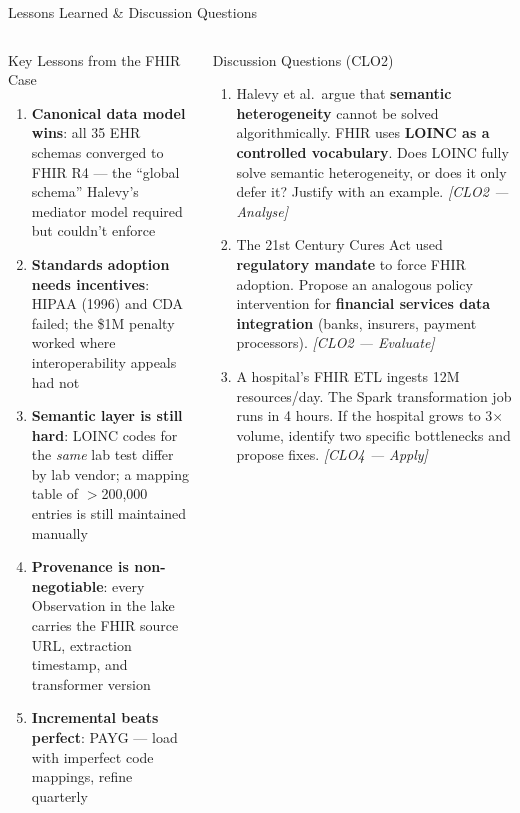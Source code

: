 \documentclass[aspectratio=169,10pt]{beamer}
\begin{document}
\begin{frame}{Lessons Learned \& Discussion Questions}
  \begin{columns}[T]
      \begin{block}{Key Lessons from the FHIR Case}
        \begin{enumerate}
          \item \textbf{Canonical data model wins}: all 35 EHR schemas
                converged to FHIR R4 — the ``global schema''
                Halevy's mediator model required but couldn't enforce
          \item \textbf{Standards adoption needs incentives}:
                HIPAA (1996) and CDA failed; the \$1M penalty
                worked where interoperability appeals had not
          \item \textbf{Semantic layer is still hard}: LOINC codes
                for the \emph{same} lab test differ by lab vendor;
                a mapping table of $>$200{,}000 entries is still maintained manually
          \item \textbf{Provenance is non-negotiable}: every Observation
                in the lake carries the FHIR source URL, extraction
                timestamp, and transformer version
          \item \textbf{Incremental beats perfect}: PAYG — load with
                imperfect code mappings, refine quarterly
        \end{enumerate}
      \end{block}

      \begin{alertblock}{Discussion Questions \textmd{\tiny (CLO2)}}
        \begin{enumerate}
          \item Halevy et al.\ argue that \textbf{semantic heterogeneity}
                cannot be solved algorithmically. FHIR uses \textbf{LOINC
                as a controlled vocabulary}. Does LOINC fully solve
                semantic heterogeneity, or does it only defer it?
                Justify with an example.
                \textit{[CLO2 — Analyse]}
          \item The 21st Century Cures Act used \textbf{regulatory mandate}
                to force FHIR adoption. Propose an analogous policy
                intervention for \textbf{financial services data integration}
                (banks, insurers, payment processors).
                \textit{[CLO2 — Evaluate]}
          \item A hospital's FHIR ETL ingests 12M resources/day.
                The Spark transformation job runs in 4 hours.
                If the hospital grows to 3$\times$ volume,
                identify two specific bottlenecks and propose fixes.
                \textit{[CLO4 — Apply]}
        \end{enumerate}
      \end{alertblock}
  \end{columns}
\end{frame}
\end{document}
